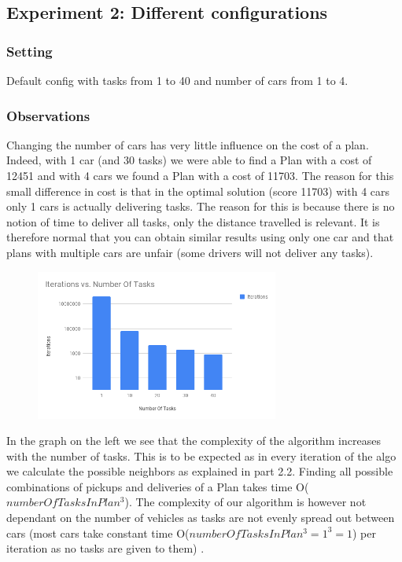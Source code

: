 \documentclass[11pt]{article}
\begin{document}
 \subsection{Experiment 2: Different configurations}

 \subsubsection{Setting}
 Default config with tasks from 1 to 40 and number of cars from 1 to 4.

 \subsubsection{Observations}
 Changing the number of cars has very little influence on the cost of a plan. Indeed, with 1 car (and 30 tasks) we were able to find a Plan with a cost of 12451 and with 4 cars we found a Plan with a cost of 11703. The reason for this small difference in cost is that in the optimal solution (score 11703) with 4 cars only 1 cars is actually delivering tasks. The reason for this is because there is no notion of time to deliver all tasks, only the distance travelled is relevant. It is therefore normal that you can obtain similar results using only one car and that plans with multiple cars are unfair (some drivers will not deliver any tasks).

 \begin{figure}
  \includegraphics[width=8cm]{iterations.png}
 \end{figure}
 In the graph on the left we see that the complexity of the algorithm increases with the number of tasks. This is to be expected as in every iteration of the algo we calculate the possible neighbors as explained in part 2.2. Finding all possible combinations of pickups and deliveries of a Plan takes time O($numberOfTasksInPlan^3$). The complexity of our algorithm is however not dependant on the number of vehicles as tasks are not evenly spread out between cars (most cars take constant time O($numberOfTasksInPlan^3 = 1^3 = 1$) per iteration as no tasks are given to them) .
\end{document}
